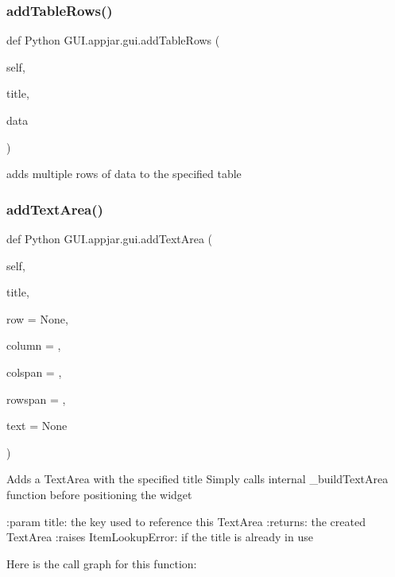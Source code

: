 \subsubsection{\texorpdfstring{add\+Table\+Rows()}{addTableRows()}}
{\footnotesize\ttfamily def Python G\+U\+I.\+appjar.\+gui.\+add\+Table\+Rows (\begin{DoxyParamCaption}\item[{}]{self,  }\item[{}]{title,  }\item[{}]{data }\end{DoxyParamCaption})}

\begin{DoxyVerb}adds multiple rows of data to the specified table \end{DoxyVerb}
 \mbox{\label{class_python_01_g_u_i_1_1appjar_1_1gui_a49054304ee257e29b47c61261f277005}} 
\subsubsection{\texorpdfstring{add\+Text\+Area()}{addTextArea()}}
{\footnotesize\ttfamily def Python G\+U\+I.\+appjar.\+gui.\+add\+Text\+Area (\begin{DoxyParamCaption}\item[{}]{self,  }\item[{}]{title,  }\item[{}]{row = {\ttfamily None},  }\item[{}]{column = {},  }\item[{}]{colspan = {},  }\item[{}]{rowspan = {},  }\item[{}]{text = {\ttfamily None} }\end{DoxyParamCaption})}

\begin{DoxyVerb}Adds a TextArea with the specified title
Simply calls internal _buildTextArea function before positioning the widget

:param title: the key used to reference this TextArea
:returns: the created TextArea
:raises ItemLookupError: if the title is already in use
\end{DoxyVerb}
 Here is the call graph for this function\+:
\mbox{\label{class_python_01_g_u_i_1_1appjar_1_1gui_a2c331e366fb743ffb44e4b1ae6662a45}} 
